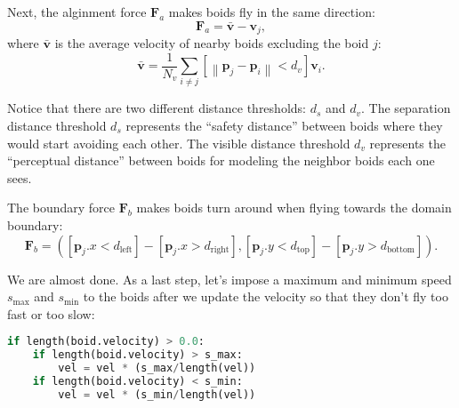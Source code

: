 Next, the alginment force $\mathbf{F}_a$ makes boids fly in the same direction:
\begin{equation}
\mathbf{F}_a = \bar{\mathbf{v}} - \mathbf{v}_j,
\end{equation}
where $\bar{\mathbf{v}}$ is the average velocity of nearby boids excluding the boid $j$:
\begin{equation}
\bar{\mathbf{v}} = \frac{1}{N_v} \sum_{i \neq j} \left[\left\|\mathbf{p}_j - \mathbf{p}_i\right\| < d_v\right] \mathbf{v}_i.
\end{equation}

Notice that there are two different distance thresholds: $d_s$ and $d_v$. The separation distance threshold $d_s$ represents the ``safety distance'' between boids where they would start avoiding each other. The visible distance threshold $d_v$ represents the ``perceptual distance'' between boids for modeling the neighbor boids each one sees.

The boundary force $\mathbf{F}_b$ makes boids turn around when flying towards the domain boundary:
\begin{equation}
\mathbf{F}_b = \left(\left[\mathbf{p}_j.x < d_{\text{left}}\right] - \left[\mathbf{p}_j.x > d_{\text{right}}\right], \left[\mathbf{p}_j.y < d_{\text{top}}\right] - \left[\mathbf{p}_j.y > d_{\text{bottom}}\right]\right).
\end{equation}

We are almost done. As a last step, let's impose a maximum and minimum speed $s_{\text{max}}$ and $s_{\text{min}}$ to the boids after we update the velocity so that they don't fly too fast or too slow:
\begin{lstlisting}[language=Python]
if length(boid.velocity) > 0.0:
    if length(boid.velocity) > s_max:
        vel = vel * (s_max/length(vel))
    if length(boid.velocity) < s_min:
        vel = vel * (s_min/length(vel))
\end{lstlisting}

